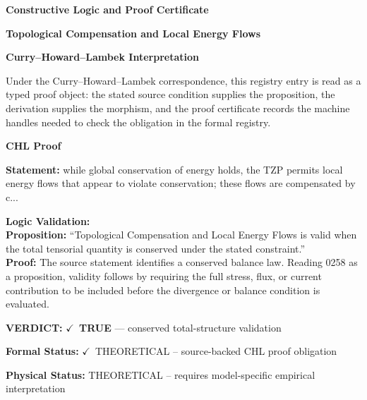 \clearpage
\begingroup\tzpsupportsetup
\noindent\textbf{\fontsize{10.8pt}{12.8pt}\selectfont [ID 0258] Constructive Logic and Proof Certificate}\par
\noindent\textbf{\fontsize{10pt}{12pt}\selectfont Topological Compensation and Local Energy Flows}\par
\vspace{0.45em}
\begingroup
\footnotesize
\setlength{\parskip}{0.22em}
\setlength{\parindent}{0pt}
\noindent\textbf{Curry--Howard--Lambek Interpretation}\par
Under the Curry--Howard--Lambek correspondence, this registry entry is read as a typed proof
object: the stated source condition supplies the proposition, the derivation supplies the
morphism, and the proof certificate records the machine handles needed to check the obligation
in the formal registry.

\vspace{0.45em}
\noindent\textbf{CHL Proof}\par
\textbf{Statement:} while global conservation of energy holds, the TZP permits local energy flows that
appear to violate conservation; these flows are compensated by c...

\textbf{Logic Validation:}\\
\textbf{Proposition:} ``Topological Compensation and Local Energy Flows is valid when the total tensorial
quantity is conserved under the stated constraint.''\\
\textbf{Proof:} The source statement identifies a conserved balance law. Reading 0258 as a proposition,
validity follows by requiring the full stress, flux, or current contribution to be
included before the divergence or balance condition is evaluated.

\textbf{VERDICT:} \ensuremath{\checkmark}\ \textbf{TRUE} --- conserved total-structure validation

\textbf{Formal Status:} \ensuremath{\checkmark}\ THEORETICAL -- source-backed CHL proof obligation

\textbf{Physical Status:} THEORETICAL -- requires model-specific empirical interpretation
\par\vspace{0.45em}
\par
\ifTZPDarkEdition
{}
\fi
\endgroup
\endgroup
